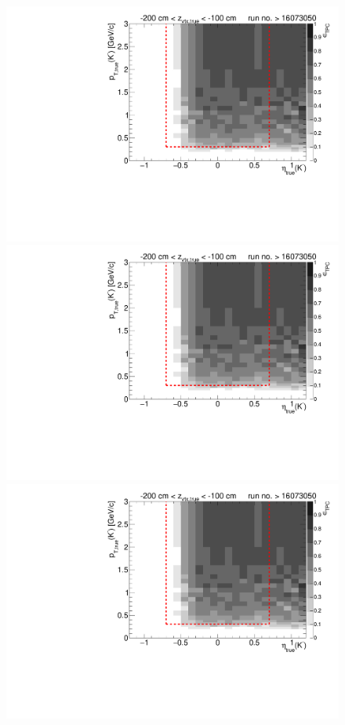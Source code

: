 \begin{figure}[hb]\ContinuedFloat
	\centering
	\parbox{0.495\textwidth}{
		\centering
		\includegraphics[width=\linewidth,page=11]{graphics/eff/Eff2D_TPC_kaon_Minus_RunRange2.pdf}\\
		\includegraphics[width=\linewidth,page=13]{graphics/eff/Eff2D_TPC_kaon_Minus_RunRange2.pdf}\\
		\includegraphics[width=\linewidth,page=15]{graphics/eff/Eff2D_TPC_kaon_Minus_RunRange2.pdf}\\
}
\end{figure}
